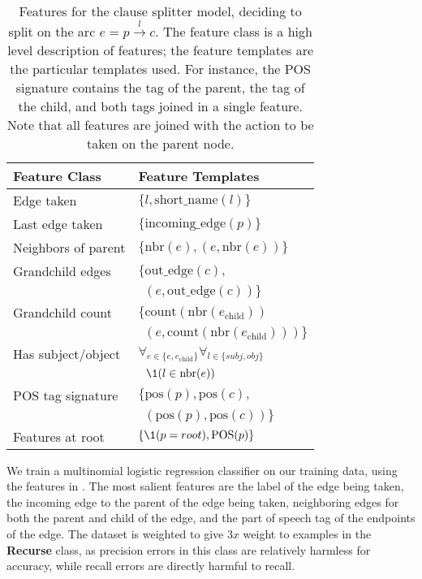 %
%

\begin{table}
\begin{tabular}{ll}
  \textbf{Feature Class} & \textbf{Feature Templates} \\
  \hline
  Edge taken          & $\{ l, \textrm{short\_name}(l) \}$ \\
  Last edge taken     & $\{ \textrm{incoming\_edge}(p) \}$ \\
  Neighbors of parent & $\{ \textrm{nbr}(e), (e, \textrm{nbr}(e)) \}$ \\
  Grandchild edges    & $\{ \textrm{out\_edge}(c), $ \\
                      & $~~ (e, \textrm{out\_edge}(c)) \}$ \\
  Grandchild count    & $\{ \textrm{count}\left( \textrm{nbr}(e_\textrm{child}) \right) $ \\
                      & $~~ \left(e, \textrm{count}\left( \textrm{nbr}(e_\textrm{child}) \right) \right) \}$ \\
  Has subject/object  & $\forall_{e \in \{e, e_\textrm{child}\}} \forall_{l \in \{\textit{subj}, \textit{obj}\}} $ \\
                      & $~~ \1(l \in \textrm{nbr}(e)) $ \\
  POS tag signature   & $\{ \textrm{pos}(p), \textrm{pos}(c), $ \\
                      & $~~ \left( \textrm{pos}(p), \textrm{pos}(c) \right) \}$ \\
  Features at root    & $\{ \1(p = root), \textrm{POS}(p) \}$
\end{tabular}
\caption{\label{tab:features}
Features for the clause splitter model, deciding to split on the arc
  $e = p \xrightarrow{l} c$.
The feature class is a high level description of features; the feature
  templates are the particular templates used.
For instance, the POS signature contains the tag of the parent, the tag of
  the child, and both tags joined in a single feature.
Note that all features are joined with the action to be taken on the parent
  node.
}
\end{table}

We train a multinomial logistic regression classifier on our training data,
  using the features in .
The most salient features are the label of the edge being taken, the
  incoming edge to the parent of the edge being taken, neighboring edges
  for both the parent and child of the edge, and the part of speech tag of
  the endpoints of the edge.
The dataset is weighted to give $3x$ weight to examples in the \textbf{Recurse}
  class, as precision errors in this class are relatively harmless for accuracy,
  while recall errors are directly harmful to recall.

